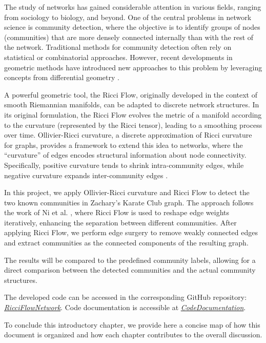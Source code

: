 The study of networks has gained considerable attention in various fields, ranging from sociology to biology, and beyond. One of the central problems in network science is community detection, where the objective is to identify groups of nodes (communities) that are more densely connected internally than with the rest of the network. Traditional methods for community detection often rely on statistical or combinatorial approaches. However, recent developments in geometric methods have introduced new approaches to this problem by leveraging concepts from differential geometry \cite{Ni:communitydetectionnetworksricci}.

A powerful geometric tool, the Ricci Flow, originally developed in the context of smooth Riemannian manifolds, can be adapted to discrete network structures. In its original formulation, the Ricci Flow evolves the metric of a manifold according to the curvature (represented by the Ricci tensor), leading to a smoothing process over time. Ollivier-Ricci curvature, a discrete approximation of Ricci curvature for graphs, provides a framework to extend this idea to networks, where the “curvature” of edges encodes structural information about node connectivity. Specifically, positive curvature tends to shrink intra-community edges, while negative curvature expands inter-community edges \cite{Ni:communitydetectionnetworksricci}.

In this project, we apply Ollivier-Ricci curvature and Ricci Flow to detect the two known communities in Zachary's Karate Club graph. The approach follows the work of Ni et al. \cite{Ni:communitydetectionnetworksricci}, where Ricci Flow is used to reshape edge weights iteratively, enhancing the separation between different communities. After applying Ricci Flow, we perform edge surgery to remove weakly connected edges and extract communities as the connected components of the resulting graph.

The results will be compared to the predefined community labels, allowing for a direct comparison between the detected communities and the actual community structures. 

The developed code can be accessed in the corresponding GitHub repository: \textit{\href{https://github.com/fabbri-lorenzo/RicciFlowNetwork}{RicciFlowNetwork}}.
Code documentation is accessible at \textit{\href{https://fabbri-lorenzo.github.io/RicciFlowNetwork/}{CodeDocumentation}}.

To conclude this introductory chapter, we provide here a concise map of how this document is organized and how each chapter contributes to the overall discussion.

